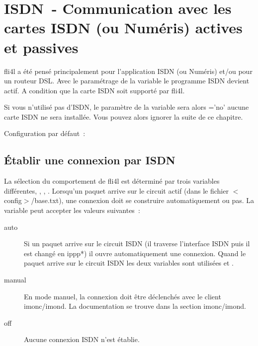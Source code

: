 
\section {ISDN~- Communication avec les cartes ISDN (ou Numéris) actives et passives}

fli4l a été pensé principalement pour l'application ISDN (ou Numéris)
et/ou pour un routeur DSL. Avec le paramétrage de la variable 
 le programme ISDN devient actif. A condition
que la carte ISDN soit supporté par fli4l.

Si vous n'utilisé pas d'ISDN, le paramètre de la variable sera alors
='no' aucune carte ISDN ne sera installée. Vous
pouvez alors ignorer la suite de ce chapitre.

Configuration par défaut~: 

\subsection {Établir une connexion par ISDN}
\begin{sloppypar}
La sélection du comportement de fli4l est déterminé par trois variables
différentes, \mbox{,} ,
. Lorsqu'un paquet arrive sur le circuit 
 actif (dans le fichier $<$config$>$/base.txt),
une connexion doit se construire automatiquement ou pas. La variable
 peut accepter les valeurs suivantes~:
\end{sloppypar}

\begin{description}
\item[auto] Si un paquet arrive sur le circuit ISDN (il traverse
l'interface ISDN puis il est changé en ippp*) il ouvre automatiquement une connexion.
Quand le paquet arrive sur le circuit ISDN les deux variables sont utilisées
 et .

\item[manual] En mode manuel, la connexion doit être déclenchés avec
le client imonc/imond. La documentation se trouve dans la section imonc/imond.

\item[off] Aucune connexion ISDN n'est établie.
\end{description}

